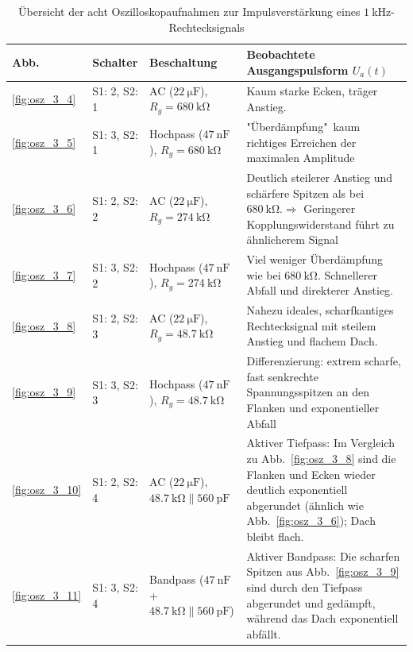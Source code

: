 \documentclass[12pt,a4paper,titlepage]{scrartcl}
\numberwithin{equation}{section}
\numberwithin{table}{section}
\numberwithin{figure}{section}
\begin{document}
\begin{table}[H]
    \centering
    \caption{Übersicht der acht Oszilloskopaufnahmen zur Impulsverstärkung eines $\SI{1}{\kilo\hertz}$-Rechtecksignals}
    \label{tab:uebersicht_a3}
    \footnotesize
    \setlength{\tabcolsep}{4pt}
    \begin{tabular}{ll>{\raggedright\arraybackslash}p{4.3cm}>{\raggedright\arraybackslash}p{7.4cm}}
        \toprule
        \textbf{Abb.} & \textbf{Schalter} & \textbf{Beschaltung} & \textbf{Beobachtete Ausgangspulsform $U_a(t)$} \\
        \midrule
        \ref{fig:osz_3_4} & S1: 2, S2: 1 & AC ($\SI{22}{\micro\farad}$), $R_g = \SI{680}{\kilo\ohm}$ & Kaum starke Ecken, träger Anstieg. \\
        \addlinespace[3pt]
        \ref{fig:osz_3_5} & S1: 3, S2: 1 & Hochpass ($\SI{47}{\nano\farad}$), $R_g = \SI{680}{\kilo\ohm}$ & "Überdämpfung"\ kaum richtiges Erreichen der maximalen Amplitude \\
        \addlinespace[3pt]
        \ref{fig:osz_3_6} & S1: 2, S2: 2 & AC ($\SI{22}{\micro\farad}$), $R_g = \SI{274}{\kilo\ohm}$ & Deutlich steilerer Anstieg und schärfere Spitzen als bei $\SI{680}{\kilo\ohm}. \Rightarrow$ Geringerer Kopplungswiderstand führt zu ähnlicherem Signal \\
        \addlinespace[3pt]
        \ref{fig:osz_3_7} & S1: 3, S2: 2 & Hochpass ($\SI{47}{\nano\farad}$), $R_g = \SI{274}{\kilo\ohm}$ & Viel weniger Überdämpfung wie bei $\SI{680}{\kilo\ohm}$. Schnellerer Abfall und direkterer Anstieg. \\
        \addlinespace[3pt]
        \ref{fig:osz_3_8} & S1: 2, S2: 3 & AC ($\SI{22}{\micro\farad}$), $R_g = \SI{48.7}{\kilo\ohm}$ & Nahezu ideales, scharfkantiges Rechtecksignal mit steilem Anstieg und flachem Dach. \\
        \addlinespace[3pt]
        \ref{fig:osz_3_9} & S1: 3, S2: 3 & Hochpass ($\SI{47}{\nano\farad}$), $R_g = \SI{48.7}{\kilo\ohm}$ & Differenzierung: extrem scharfe, fast senkrechte Spannungsspitzen an den Flanken und exponentieller Abfall \\
        \addlinespace[3pt]
        \ref{fig:osz_3_10} & S1: 2, S2: 4 & AC ($\SI{22}{\micro\farad}$), $\SI{48.7}{\kilo\ohm} \parallel \SI{560}{\pico\farad}$ & Aktiver Tiefpass: Im Vergleich zu Abb.~\ref{fig:osz_3_8} sind die Flanken und Ecken wieder deutlich exponentiell abgerundet (ähnlich wie Abb.~\ref{fig:osz_3_6}); Dach bleibt flach. \\
        \addlinespace[3pt]
        \ref{fig:osz_3_11} & S1: 3, S2: 4 & Bandpass ($\SI{47}{\nano\farad}$ + $\SI{48.7}{\kilo\ohm} \parallel \SI{560}{\pico\farad}$) & Aktiver Bandpass: Die scharfen Spitzen aus Abb.~\ref{fig:osz_3_9} sind durch den Tiefpass abgerundet und gedämpft, während das Dach exponentiell abfällt. \\
        \bottomrule
    \end{tabular}
\end{table}
\end{document}
